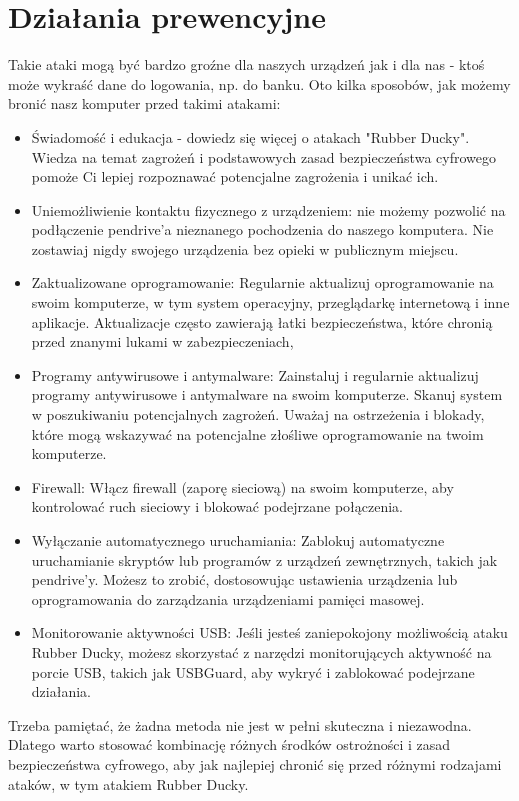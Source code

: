 \documentclass{article}
\begin{document}
\section{Działania prewencyjne}

Takie ataki mogą być bardzo groźne dla naszych urządzeń jak i dla nas - ktoś może wykraść dane do logowania, np. do banku.
Oto kilka sposobów, jak możemy bronić nasz komputer przed takimi atakami:
\begin{itemize}
    \item Świadomość i edukacja - dowiedz się więcej o atakach "Rubber Ducky". Wiedza na temat zagrożeń i podstawowych zasad bezpieczeństwa cyfrowego pomoże Ci lepiej rozpoznawać potencjalne zagrożenia i unikać ich.
    \item Uniemożliwienie kontaktu fizycznego z urządzeniem: nie możemy pozwolić na podłączenie pendrive'a nieznanego pochodzenia do naszego komputera. Nie zostawiaj nigdy swojego urządzenia bez opieki w publicznym miejscu.
    \item Zaktualizowane oprogramowanie: Regularnie aktualizuj oprogramowanie na swoim komputerze, w tym system operacyjny, przeglądarkę internetową i inne aplikacje. Aktualizacje często zawierają łatki bezpieczeństwa, które chronią przed znanymi lukami w zabezpieczeniach,
    \item Programy antywirusowe i antymalware: Zainstaluj i regularnie aktualizuj programy antywirusowe i antymalware na swoim komputerze. Skanuj system w poszukiwaniu potencjalnych zagrożeń. Uważaj na ostrzeżenia i blokady, które mogą wskazywać na potencjalne złośliwe oprogramowanie na twoim komputerze.
    \item Firewall: Włącz firewall (zaporę sieciową) na swoim komputerze, aby kontrolować ruch sieciowy i blokować podejrzane połączenia.
    \item Wyłączanie automatycznego uruchamiania: Zablokuj automatyczne uruchamianie skryptów lub programów z urządzeń zewnętrznych, takich jak pendrive'y. Możesz to zrobić, dostosowując ustawienia urządzenia lub oprogramowania do zarządzania urządzeniami pamięci masowej.
    \item Monitorowanie aktywności USB: Jeśli jesteś zaniepokojony możliwością ataku Rubber Ducky, możesz skorzystać z narzędzi monitorujących aktywność na porcie USB, takich jak USBGuard, aby wykryć i zablokować podejrzane działania.
\end{itemize}

Trzeba pamiętać, że żadna metoda nie jest w pełni skuteczna i niezawodna. Dlatego warto stosować kombinację różnych środków ostrożności i zasad bezpieczeństwa cyfrowego, aby jak najlepiej chronić się przed różnymi rodzajami ataków, w tym atakiem Rubber Ducky.
\end{document}
